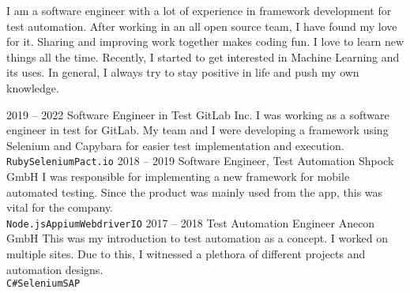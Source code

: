 \documentclass[9pt]{developercv} %
\begin{document}
\vspace{0.5cm}



\begin{minipage}[t]{0.4\textwidth} %
	\vspace{-\baselineskip} %
	
	I am a software engineer with a lot of experience in framework development for test automation. After working in an all open source team, I have found my love for it. Sharing and improving work together makes coding fun. I love to learn new things all the time. Recently, I started to get interested in Machine Learning and its uses. In general, I always try to stay positive in life and push my own knowledge.\\
\end{minipage}
\hfill %
\begin{minipage}[t]{0.5\textwidth} %
	\vspace{-\baselineskip} %
	\begin{barchart}{5.5}
	\end{barchart}
\end{minipage}



\begin{entrylist}
	\entry
		{2019 -- 2022}
		{Software Engineer in Test}
		{GitLab Inc.}
		{I was working as a software engineer in test for GitLab. My team and I were developing a framework using Selenium and Capybara for easier test implementation and execution.\\ \texttt{Ruby}\slashsep\texttt{Selenium}\slashsep\texttt{Pact.io}}
	\entry
		{2018 -- 2019}
		{Software Engineer, Test Automation}
		{Shpock GmbH}
		{I was responsible for implementing a new framework for mobile automated testing. Since the product was mainly used from the app, this was vital for the company.\\ \texttt{Node.js}\slashsep\texttt{Appium}\slashsep\texttt{WebdriverIO}}
	\entry
		{2017 -- 2018}
		{Test Automation Engineer}
		{Anecon GmbH}
		{This was my introduction to test automation as a concept. I worked on multiple sites. Due to this, I witnessed a plethora of different projects and automation designs.\\ \texttt{C\#}\slashsep\texttt{Selenium}\slashsep\texttt{SAP}}
\end{entrylist}
\end{document}
